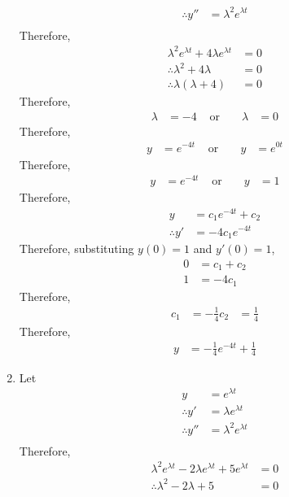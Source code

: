 \documentclass[fleqn, a4paper, 11pt, oneside]{amsart}
\theoremstyle{definition}
\theoremstyle{theorem}
\begin{document}
\begin{solution}
\begin{enumerate}[leftmargin = *]
\begin{align*}
				\therefore y'' & = \lambda^2 e^{\lambda t} \\
			\end{align*}
			Therefore,
			\begin{align*}
				\lambda^2 e^{\lambda t} + 4 \lambda e^{\lambda t} & = 0 \\
				\therefore \lambda^2 + 4 \lambda                  & = 0 \\
				\therefore \lambda (\lambda + 4)                  & = 0
			\end{align*}
			Therefore,
			\begin{align*}
				\lambda & = -4 & \text{ or } &  & \lambda & = 0
			\end{align*}
			Therefore,
			\begin{align*}
				y & = e^{-4 t} & \text{ or } &  & y & = e^{0 t}
			\end{align*}
			Therefore,
			\begin{align*}
				y & = e^{-4 t} & \text{ or } &  & y & = 1
			\end{align*}
			Therefore,
			\begin{align*}
				y &= c_1 e^{-4 t} + c_2\\
				\therefore y' &= -4 c_1 e^{-4 t}
			\end{align*}
			Therefore, substituting $y(0) = 1$ and $y'(0) = 1$,
			\begin{align*}
				0 &= c_1 + c_2\\
				1 &= -4 c_1
			\end{align*}
			Therefore,
			\begin{align*}
				c_1 &= -\frac{1}{4}
				c_2 &= \frac{1}{4}
			\end{align*}
			Therefore,
			\begin{align*}
				y &= -\frac{1}{4} e^{-4 t} + \frac{1}{4}
			\end{align*}
		\item
			Let
			\begin{align*}
				y              & = e^{\lambda t}           \\
				\therefore y'  & = \lambda e^{\lambda t}   \\
				\therefore y'' & = \lambda^2 e^{\lambda t} \\
			\end{align*}
			Therefore,
			\begin{align*}
				\lambda^2 e^{\lambda t} - 2 \lambda e^{\lambda t} + 5 e^{\lambda t} & = 0 \\
				\therefore \lambda^2 - 2 \lambda + 5                                & = 0

\end{align*}
\end{enumerate}
\end{solution}
\end{document}

